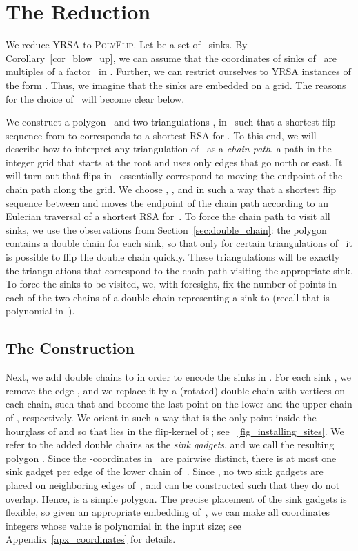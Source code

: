 \documentclass[a4paper,11pt]{article}
\begin{document}
\section{The Reduction}\label{sec_reduction}
We reduce YRSA to \textsc{PolyFlip}.
Let  be a set of~ sinks.
By Corollary~\ref{cor_blow_up}, we can assume that the coordinates of sinks of~ are multiples of a factor~ in .
Further, we can restrict ourselves to YRSA instances of the form .
Thus, we imagine that the sinks are embedded on a  grid.
The reasons for the choice of~ will become clear below.

We construct a polygon~ and two triangulations ,  in~ such that a shortest flip sequence from  to  corresponds to a shortest RSA for .
To this end, we will describe how to interpret any triangulation of~ as a \emph{chain path}, a path in the integer grid that starts at the root and uses only edges that go north or east.
It will turn out that flips in~ essentially correspond to moving the endpoint of the chain path along the grid.
We choose , , and  in such a way that a shortest flip sequence between  and  moves the endpoint of the chain path according to an Eulerian traversal of a shortest RSA for~.
To force the chain path to visit all sinks, we use the observations from Section~\ref{sec:double_chain}: the polygon  contains a double chain for each sink, so that only for certain triangulations of~ it is possible to flip the double chain quickly.
These triangulations will be exactly the triangulations that correspond to the chain path visiting
the appropriate sink.
To force the sinks to be visited, we, with foresight, fix the number of points in each of the two chains of a double chain representing a sink to  (recall that  is polynomial in~).

\subsection{The Construction}
\label{sec_construction}
Next, we add double chains to  in order to encode the sinks in .
For each sink , we remove the edge , and we replace it by a (rotated) double chain  with  vertices on each chain, such that  and  become the last point on the lower and the upper chain of , respectively.
We orient  in such a way that  is the only point inside the hourglass of  and so that  lies in the flip-kernel of ; see \figurename~\ref{fig_installing_sites}.
We refer to the added double chains as the \emph{sink gadgets}, and
we call the resulting polygon .
Since the -coordinates in~ are pairwise distinct, there is at most one sink gadget per edge of the lower chain of~.
Since , no two sink gadgets are placed on neighboring edges of~, and can be constructed such that they do not overlap.
Hence,  is a simple polygon.
The precise placement of the sink gadgets is flexible, so given an appropriate embedding of~, we can make all coordinates integers whose value is polynomial in the input size;
see Appendix~\ref{apx_coordinates} for details.
\end{document}

